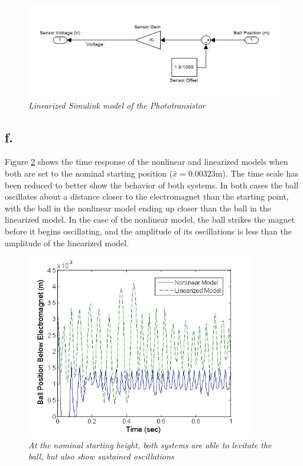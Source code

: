 \documentclass{article}
\theoremstyle{plain}
\theoremstyle{definition}
\theoremstyle{remark}
\begin{document}
\begin{figure}
\begin{center}
\includegraphics[width = 15cm]{LinearUnControlledSensor}
\caption{\emph{Linearized Simulink model of the Phototransistor}}
\label{Q1_e9}
\end{center}
\end{figure}



\subsection*{f.}
Figure \ref{Q1_f1} shows the time response of the nonlinear and linearized models when both are set to the nominal starting position ($\bar{x} = 0.00323$m). The time scale has been reduced to better show the behavior of both systems. In both cases the ball oscillates about a distance closer to the electromagnet than the starting point, with the ball in the nonlinear model ending up closer than the ball in the linearized model. In the case of the nonlinear model, the ball strikes the magnet before it begins oscillating, and the amplitude of its oscillations is less than the amplitude of the linearized model.\\
\begin{figure}[htb]
\begin{center}
\includegraphics[width = 10cm]{Part1fNoDisturbance}
\caption{\emph{At the nominal starting height, both systems are able to levitate the ball, but also show sustained oscillations }}
\label{Q1_f1}
\end{center}
\end{figure}
\end{document}
